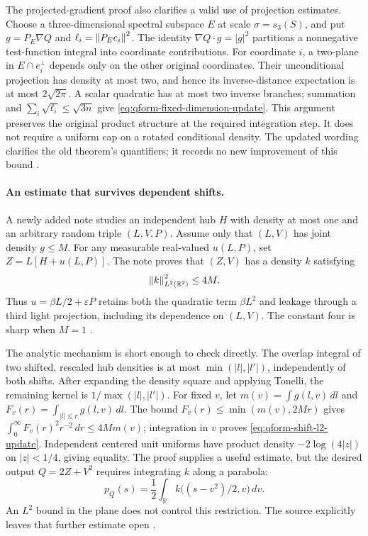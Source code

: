 The projected-gradient proof also clarifies a valid use of projection estimates.
Choose a three-dimensional spectral subspace $E$ at scale $\sigma=s_3(S)$, and put $g=P_E\nabla Q$ and $\ell_i=\left\lVert P_Ee_i\right\rVert^2$.
The identity $\nabla Q\cdot g=|g|^2$ partitions a nonnegative test-function integral into coordinate contributions.
For coordinate $i$, a two-plane in $E\cap e_i^\perp$ depends only on the other original coordinates.
Their unconditional projection has density at most two, and hence its inverse-distance expectation is at most $2\sqrt{2\pi}$.
A scalar quadratic has at most two inverse branches; summation and $\sum_i\sqrt{\ell_i}\leq\sqrt{3n}$ give \eqref{eq:qform-fixed-dimension-update}.
This argument preserves the original product structure at the required integration step.
It does not require a uniform cap on a rotated conditional density.
The updated wording clarifies the old theorem's quantifiers; it records no new improvement of this bound \citep{CaseQFORMCurrentStructure2026}.

\paragraph{An estimate that survives dependent shifts.}
A newly added note studies an independent hub $H$ with density at most one and an arbitrary random triple $(L,V,P)$.
Assume only that $(L,V)$ has joint density $g\leq M$.
For any measurable real-valued $u(L,P)$, set $Z=L[H+u(L,P)]$.
The note proves that $(Z,V)$ has a density $k$ satisfying
\begin{equation}
 \left\lVert k\right\rVert_{L^2(\mathbb R^2)}^2\leq4M.
 \label{eq:qform-shift-l2-update}
\end{equation}
Thus $u=\beta L/2+\varepsilon P$ retains both the quadratic term $\beta L^2$ and leakage through a third light projection, including its dependence on $(L,V)$.
The constant four is sharp when $M=1$ \citep{CaseQFORMShiftL2_2026}.

The analytic mechanism is short enough to check directly.
The overlap integral of two shifted, rescaled hub densities is at most $\min(|l|,|l'|)$, independently of both shifts.
After expanding the density square and applying Tonelli, the remaining kernel is $1/\max(|l|,|l'|)$.
For fixed $v$, let $m(v)=\int g(l,v)\,dl$ and $F_v(r)=\int_{|l|\leq r}g(l,v)\,dl$.
The bound $F_v(r)\leq\min(m(v),2Mr)$ gives
$\int_0^\infty F_v(r)^2r^{-2}\,dr\leq4Mm(v)$; integration in $v$ proves \eqref{eq:qform-shift-l2-update}.
Independent centered unit uniforms have product density $-2\log(4|z|)$ on $|z|<1/4$, giving equality.
The proof supplies a useful estimate, but the desired output $Q=2Z+V^2$ requires integrating $k$ along a parabola:
\[
 p_Q(s)=\frac12\int_{\mathbb R}k\bigl((s-v^2)/2,v\bigr)\,dv.
\]
An $L^2$ bound in the plane does not control this restriction.
The source explicitly leaves that further estimate open \citep{CaseQFORMShiftL2_2026}.

